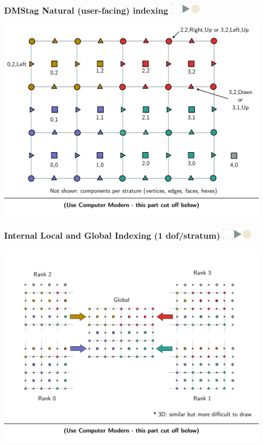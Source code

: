 \documentclass{beamer}
\newcommand\frametitlelogo[1]{\frametitle{#1\hspace{0pt plus 1 filll} \includegraphics[width=42pt]{logo_slides}}}
\begin{document}
\begin{frame}[fragile]
  \frametitlelogo{DMStag Natural (user-facing) indexing}
\includegraphics[width=\textwidth]{natural_numbering}
\end{frame}

\begin{frame}[fragile]
\frametitlelogo{Internal Local and Global Indexing (1 dof/stratum)}
\includegraphics[width=\textwidth]{local_global}
\end{frame}
\end{document}
